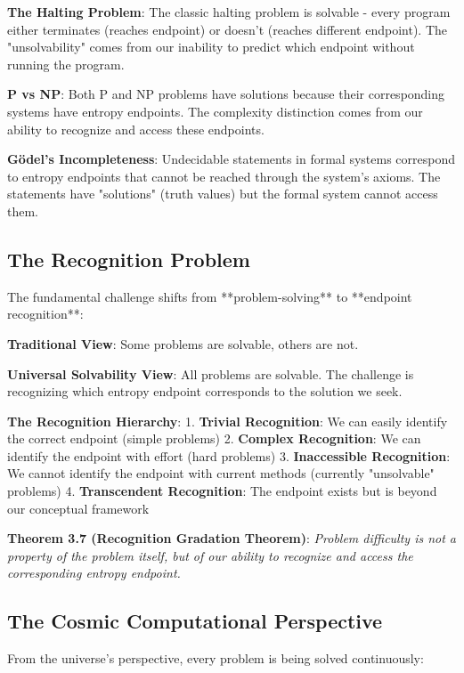 \documentclass[12pt,a4paper]{article}
\theoremstyle{definition}
\begin{document}
\textbf{The Halting Problem}: The classic halting problem is solvable - every program either terminates (reaches endpoint) or doesn't (reaches different endpoint). The "unsolvability" comes from our inability to predict which endpoint without running the program.

\textbf{P vs NP}: Both P and NP problems have solutions because their corresponding systems have entropy endpoints. The complexity distinction comes from our ability to recognize and access these endpoints.

\textbf{Gödel's Incompleteness}: Undecidable statements in formal systems correspond to entropy endpoints that cannot be reached through the system's axioms. The statements have "solutions" (truth values) but the formal system cannot access them.

\subsection{The Recognition Problem}

The fundamental challenge shifts from **problem-solving** to **endpoint recognition**:

\textbf{Traditional View}: Some problems are solvable, others are not.

\textbf{Universal Solvability View}: All problems are solvable. The challenge is recognizing which entropy endpoint corresponds to the solution we seek.

\textbf{The Recognition Hierarchy}:
1. \textbf{Trivial Recognition}: We can easily identify the correct endpoint (simple problems)
2. \textbf{Complex Recognition}: We can identify the endpoint with effort (hard problems)
3. \textbf{Inaccessible Recognition}: We cannot identify the endpoint with current methods (currently "unsolvable" problems)
4. \textbf{Transcendent Recognition}: The endpoint exists but is beyond our conceptual framework

\textbf{Theorem 3.7 (Recognition Gradation Theorem)}: \textit{Problem difficulty is not a property of the problem itself, but of our ability to recognize and access the corresponding entropy endpoint.}

\subsection{The Cosmic Computational Perspective}

From the universe's perspective, every problem is being solved continuously:
\end{document}
